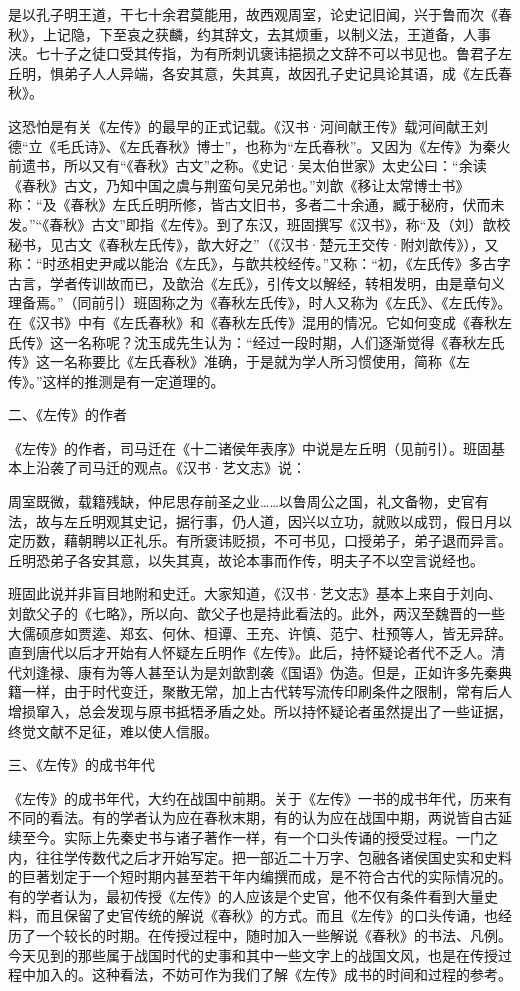 \documentclass[a4paper,12pt,UTF8,twoside]{ctexbook}
\begin{document}
是以孔子明王道，干七十余君莫能用，故西观周室，论史记旧闻，兴于鲁而次《春秋》，上记隐，下至哀之获麟，约其辞文，去其烦重，以制义法，王道备，人事浃。七十子之徒口受其传指，为有所刺讥褒讳挹损之文辞不可以书见也。鲁君子左丘明，惧弟子人人异端，各安其意，失其真，故因孔子史记具论其语，成《左氏春秋》。

这恐怕是有关《左传》的最早的正式记载。《汉书·河间献王传》载河间献王刘德“立《毛氏诗》、《左氏春秋》博士”，也称为“左氏春秋”。又因为《左传》为秦火前遗书，所以又有“《春秋》古文”之称。《史记·吴太伯世家》太史公曰：“余读《春秋》古文，乃知中国之虞与荆蛮句吴兄弟也。”刘歆《移让太常博士书》称：“及《春秋》左氏丘明所修，皆古文旧书，多者二十余通，臧于秘府，伏而未发。”“《春秋》古文”即指《左传》。到了东汉，班固撰写《汉书》，称“及（刘）歆校秘书，见古文《春秋左氏传》，歆大好之”（《汉书·楚元王交传·附刘歆传》），又称：“时丞相史尹咸以能治《左氏》，与歆共校经传。”又称：“初，《左氏传》多古字古言，学者传训故而已，及歆治《左氏》，引传文以解经，转相发明，由是章句义理备焉。”（同前引）班固称之为《春秋左氏传》，时人又称为《左氏》、《左氏传》。在《汉书》中有《左氏春秋》和《春秋左氏传》混用的情况。它如何变成《春秋左氏传》这一名称呢？沈玉成先生认为：“经过一段时期，人们逐渐觉得《春秋左氏传》这一名称要比《左氏春秋》准确，于是就为学人所习惯使用，简称《左传》。”这样的推测是有一定道理的。

二、《左传》的作者

《左传》的作者，司马迁在《十二诸侯年表序》中说是左丘明（见前引）。班固基本上沿袭了司马迁的观点。《汉书·艺文志》说：

周室既微，载籍残缺，仲尼思存前圣之业……以鲁周公之国，礼文备物，史官有法，故与左丘明观其史记，据行事，仍人道，因兴以立功，就败以成罚，假日月以定历数，藉朝聘以正礼乐。有所褒讳贬损，不可书见，口授弟子，弟子退而异言。丘明恐弟子各安其意，以失其真，故论本事而作传，明夫子不以空言说经也。

班固此说并非盲目地附和史迁。大家知道，《汉书·艺文志》基本上来自于刘向、刘歆父子的《七略》，所以向、歆父子也是持此看法的。此外，两汉至魏晋的一些大儒硕彦如贾逵、郑玄、何休、桓谭、王充、许慎、范宁、杜预等人，皆无异辞。直到唐代以后才开始有人怀疑左丘明作《左传》。此后，持怀疑论者代不乏人。清代刘逢禄、康有为等人甚至认为是刘歆割袭《国语》伪造。但是，正如许多先秦典籍一样，由于时代变迁，聚散无常，加上古代转写流传印刷条件之限制，常有后人增损窜入，总会发现与原书抵牾矛盾之处。所以持怀疑论者虽然提出了一些证据，终觉文献不足征，难以使人信服。

三、《左传》的成书年代

《左传》的成书年代，大约在战国中前期。关于《左传》一书的成书年代，历来有不同的看法。有的学者认为应在春秋末期，有的认为应在战国中期，两说皆自古延续至今。实际上先秦史书与诸子著作一样，有一个口头传诵的授受过程。一门之内，往往学传数代之后才开始写定。把一部近二十万字、包融各诸侯国史实和史料的巨著划定于一个短时期内甚至若干年内编撰而成，是不符合古代的实际情况的。有的学者认为，最初传授《左传》的人应该是个史官，他不仅有条件看到大量史料，而且保留了史官传统的解说《春秋》的方式。而且《左传》的口头传诵，也经历了一个较长的时期。在传授过程中，随时加入一些解说《春秋》的书法、凡例。今天见到的那些属于战国时代的史事和其中一些文字上的战国文风，也是在传授过程中加入的。这种看法，不妨可作为我们了解《左传》成书的时间和过程的参考。
\end{document}
